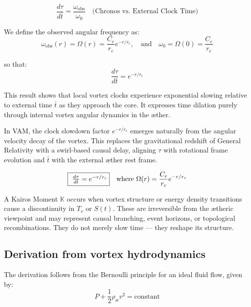 \begin{equation}
    \frac{d\tau}{d\bar{t}} = \frac{\omega_{\text{obs}}}{\omega_0}
    \quad \text{(Chronos vs. External Clock Time)}
\end{equation}

We define the observed angular frequency as:
\[
    \omega_{\text{obs}}(r) = \Omega(r) = \frac{C_e}{r_c} e^{-r/r_c}, \quad \text{and} \quad \omega_0 = \Omega(0) = \frac{C_e}{r_c}
\]

so that:
\[
    \frac{d\tau}{d\bar{t}} = e^{-r/r_c}
\]

This result shows that local vortex clocks experience exponential slowing relative to external time $\bar{t}$ as they approach the core. It expresses time dilation purely through internal vortex angular dynamics in the æther.

\begin{tcolorbox}[colback=gray!7, colframe=black!60, sharp corners=southwest, title=Frequency-Based Time Flow Interpretation]
    In VAM, the clock slowdown factor $e^{-r/r_c}$ emerges naturally from the angular velocity decay of the vortex. This replaces the gravitational redshift of General Relativity with a swirl-based causal delay, aligning $\tau$ with rotational frame evolution and $\bar{t}$ with the external æther rest frame.
\end{tcolorbox}

\begin{equation}
    \fbox{
        \(
        \frac{d\tau}{d\bar{t}} = e^{-r/r_c}
        \)}
    \quad \text{where } \Omega(r) = \frac{C_e}{r_c} e^{-r/r_c}
\end{equation}

\begin{tcolorbox}[colback=red!3, colframe=black!80, sharp corners=southwest, title=Kairos Bifurcations in Temporal Flow]
    A Kairos Moment $\mathbb{K}$ occurs when vortex structure or energy density transitions cause a discontinuity in $T_v$ or $S(t)$. These are irreversible from the ætheric viewpoint and may represent causal branching, event horizons, or topological recombinations. They do not merely slow time — they reshape its structure.
\end{tcolorbox}


\subsection{Derivation from vortex hydrodynamics}

The derivation follows from the Bernoulli principle for an ideal fluid flow, given by:
\begin{equation}\label{eq:Bernoulli}
P + \frac{1}{2}\rho_\text{\ae} v^2 = \text{constant}
\end{equation}

